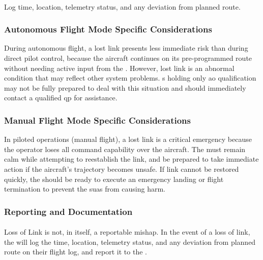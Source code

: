                \paragraph{} Log time, location, telemetry status, and any deviation from planned route.

            \subsubsection{Autonomous Flight Mode Specific Considerations} During autonomous flight, a lost link presents less immediate risk than during direct pilot control, because the aircraft continues on its pre-programmed route without needing active input from the . However, lost link is an abnormal condition that may reflect other system problems. s holding only \ac{ao} qualification may not be fully prepared to deal with this situation and should immediately contact a qualified \ac{qp} for assistance.

            \subsubsection{Manual Flight Mode Specific Considerations} In piloted operations (manual flight), a lost link is a critical emergency because the operator loses all command capability over the aircraft. The  must remain calm while attempting to reestablish the link, and be prepared to take immediate action if the aircraft’s trajectory becomes unsafe. If link cannot be restored quickly, the  should be ready to execute an emergency landing or flight termination to prevent the \ac{suas} from causing harm.
       
            \subsubsection{Reporting and Documentation}
            
                \paragraph{} Loss of Link is not, in itself, a reportable mishap. In the event of a loss of link, the  will log the time, location, telemetry status, and any deviation from planned route on their flight log, and report it to the .  
                
